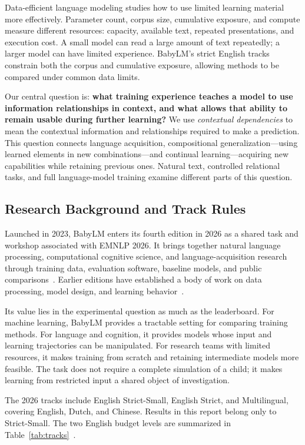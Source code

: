 Data-efficient language modeling studies how to use limited learning material more effectively. Parameter count, corpus size, cumulative exposure, and compute measure different resources: capacity, available text, repeated presentations, and execution cost. A small model can read a large amount of text repeatedly; a larger model can have limited experience. BabyLM's strict English tracks constrain both the corpus and cumulative exposure, allowing methods to be compared under common data limits.

Our central question is: \textbf{what training experience teaches a model to use information relationships in context, and what allows that ability to remain usable during further learning?} We use \emph{contextual dependencies} to mean the contextual information and relationships required to make a prediction. This question connects language acquisition, compositional generalization---using learned elements in new combinations---and continual learning---acquiring new capabilities while retaining previous ones. Natural text, controlled relational tasks, and full language-model training examine different parts of this question.

\subsection{Research Background and Track Rules}
\label{sec:setting}

Launched in 2023, BabyLM enters its fourth edition in 2026 as a shared task and workshop associated with EMNLP 2026. It brings together natural language processing, computational cognitive science, and language-acquisition research through training data, evaluation software, baseline models, and public comparisons~\citep{warstadt2023babylm,babylm2026website}. Earlier editions have established a body of work on data processing, model design, and learning behavior~\citep{charpentier2025babylm}.

Its value lies in the experimental question as much as the leaderboard. For machine learning, BabyLM provides a tractable setting for comparing training methods. For language and cognition, it provides models whose input and learning trajectories can be manipulated. For research teams with limited resources, it makes training from scratch and retaining intermediate models more feasible. The task does not require a complete simulation of a child; it makes learning from restricted input a shared object of investigation.

The 2026 tracks include English Strict-Small, English Strict, and Multilingual, covering English, Dutch, and Chinese. Results in this report belong only to Strict-Small. The two English budget levels are summarized in Table~\ref{tab:tracks}~\citep{choshen2026babylm}.

